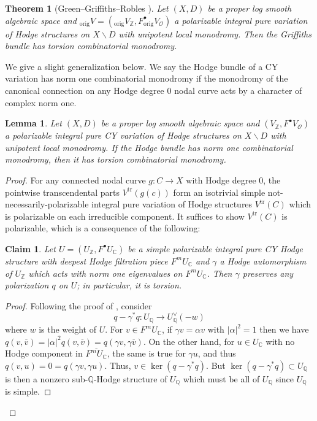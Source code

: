 \documentclass{amsart}
\newcommand{\bs}{\backslash}
\newcommand{\ol}{\overline}
\newtheorem{claim}[theorem]{Claim}
\newtheorem{lem}[theorem]{Lemma}
\newtheorem{thm}[theorem]{Theorem}
\theoremstyle{definition}
\theoremstyle{remark}
\def\bZ{\mathbb{Z}}
\def\bQ{\mathbb{Q}}
\def\bC{\mathbb{C}}
\def\cO{\mathcal{O}}
\def\trans{\mathrm{tr}}
\def\orig{\mathrm{orig}}
\def\pmax{m}
\renewcommand{\bar}[1]{\ol{#1}}
\numberwithin{equation}{section}
\begin{document}
\begin{thm}[{Green--Griffiths--Robles \cite[Theorem 5.22]{GGRtorsion}}]\label{thm:GGR}Let $(X,D)$ be a proper log smooth algebraic space and $_\orig V=(_\orig V_\bZ,F^\bullet _\orig V_\cO)$ a polarizable integral pure variation of Hodge structures on $X\bs D$ with unipotent local monodromy.  Then the Griffiths bundle has torsion combinatorial monodromy.
\end{thm}
We give a slight generalization below.  We say the Hodge bundle of a CY variation has norm one combinatorial monodromy if the monodromy of the canonical connection on any Hodge degree 0 nodal curve acts by a character of complex norm one.
\begin{lem}\label{lem:GGR}Let $(X,D)$ be a proper log smooth algebraic space and $(V_\bZ,F^\bullet V_\cO)$ a polarizable integral pure CY variation of Hodge structures on $X\bs D$ with unipotent local monodromy.  If the Hodge bundle has norm one combinatorial monodromy, then it has torsion combinatorial monodromy.
\end{lem}
\begin{proof} For any connected nodal curve $g:C\to X$ with Hodge degree 0, the pointwise transcendental parts $V^\trans(g(c))$ form an isotrivial simple not-necessarily-polarizable integral pure variation of Hodge structures $V^\trans(C)$ which is polarizable on each irreducible component.  It suffices to show $V^\trans(C)$ is polarizable, which is a consequence of the following: 
\begin{claim}\label{claim:torsion}Let $U=(U_\bZ,F^\bullet U_\bC)$ be a simple polarizable integral pure CY Hodge structure with deepest Hodge filtration piece $F^\pmax U_\bC$ and $\gamma$ a Hodge automorphism of $U_\bZ$ which acts with norm one eigenvalues on $F^\pmax U_\bC$.  Then $\gamma$ preserves any polarization $q$ on $U$; in particular, it is torsion.
\end{claim}
\begin{proof} Following the proof of \cite{GGRtorsion}, consider
\[q-\gamma^*q:U_\bQ\to U_\bQ^\vee(-w)\]
where $w$ is the weight of $U$.  For $v\in F^\pmax U_\bC$, if $\gamma v=\alpha v$ with $|\alpha|^2=1$ then we have $q(v,\bar v)=|\alpha|^2q(v,\bar v)=q(\gamma v,\gamma \bar v)$.  On the other hand, for $u\in U_\bC$ with no Hodge component in $\overline{F^\pmax U_\bC}$, the same is true for $\gamma u$, and thus $q(v,u)=0=q(\gamma v,\gamma u)$.  Thus, $v\in\ker(q-\gamma^*q)$.  But $\ker(q-\gamma^*q)\subset U_\bQ$ is then a nonzero sub-$\bQ$-Hodge structure of $U_\bQ$ which must be all of $U_\bQ$ since $U_\bQ$ is simple.
\end{proof}
\end{proof}
\end{document}
